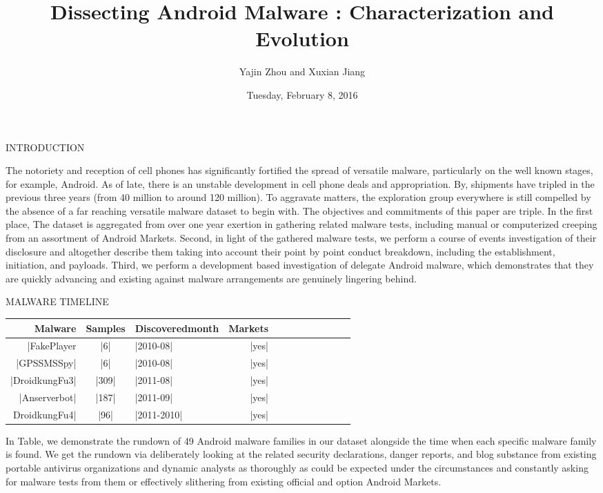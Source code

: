 \documentclass{article}
\title{Dissecting Android Malware : Characterization and Evolution}
\author{Yajin Zhou and Xuxian Jiang}
\date{Tuesday, February 8, 2016}
\begin{document}
\maketitle
INTRODUCTION
\begin{center}
The notoriety and reception of cell phones has significantly fortified the spread of versatile malware, particularly on the well known stages, for example, Android. As of late, there is an unstable development in cell phone deals and appropriation. By, shipments have tripled in the previous three years (from 40 million to around 120 million). To aggravate matters, the exploration group everywhere is still compelled by the absence of a far reaching versatile malware dataset to begin with. The objectives and commitments of this paper are triple. In the first place, The dataset is aggregated from over one year exertion in gathering related malware tests, including manual or computerized creeping from an assortment of Android Markets. Second, in light of the gathered malware tests, we perform a course of events investigation of their disclosure and altogether describe them taking into account their point by point conduct breakdown, including the establishment, initiation, and payloads. Third, we perform a development based investigation of delegate Android malware, which demonstrates that they are quickly advancing and existing against malware arrangements are genuinely lingering behind. \\
\end{center}
MALWARE TIMELINE
\begin{center}
\begin{tabular}{|r|c|l|r|c|l|r|c|l|r|c|l|}
\hline
Malware & Samples & Discoveredmonth & Markets\\
\hline
|FakePlayer & |6| & |2010-08| & |yes| \\
\hline
|GPSSMSSpy| & |6| & |2010-08| & |yes| \\
\hline
|DroidkungFu3| & |309| & |2011-08| & |yes| \\
\hline
|Anserverbot| & |187| & |2011-09| & |yes| \\
\hline
DroidkungFu4| & |96| & |2011-2010| & |yes| \\
\hline
\end{tabular}
\end{center}
\begin{center}
In Table, we demonstrate the rundown of 49 Android malware families in our dataset alongside the time when each specific malware family is found. We get the rundown via deliberately looking at the related security declarations, danger reports, and blog substance from existing portable antivirus organizations and dynamic analysts as thoroughly as could be expected under the circumstances and constantly asking for malware tests from them or effectively slithering from existing official and option Android Markets.\\
\end{center}
\end{document}
